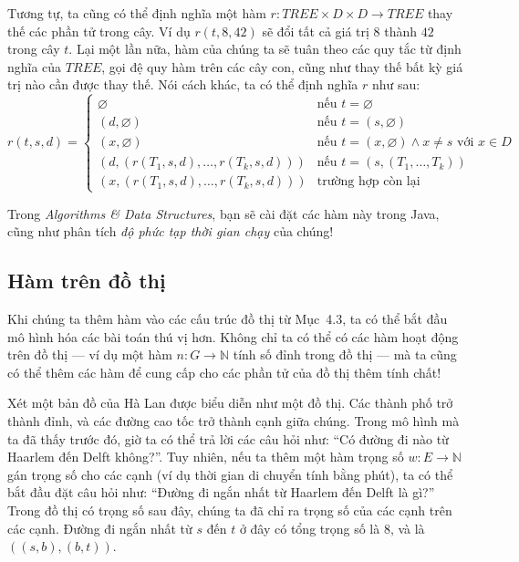 Tương tự, ta cũng có thể định nghĩa một hàm $r\colon \mathit{TREE} \times D \times D \to \mathit{TREE}$ thay thế các phần tử trong cây. Ví dụ $r(t,8,42)$ sẽ đổi tất cả giá trị $8$ thành $42$ trong cây $t$. Lại một lần nữa, hàm của chúng ta sẽ tuân theo các quy tắc từ định nghĩa của $\mathit{TREE}$, gọi đệ quy hàm trên các cây con, cũng như thay thế bất kỳ giá trị nào cần được thay thế. Nói cách khác, ta có thể định nghĩa $r$ như sau:
\[
r(t,s,d) = \begin{cases}
\varnothing & \text{nếu } t = \varnothing \\
(d, \varnothing) & \text{nếu } t = (s, \varnothing) \\
(x, \varnothing) & \text{nếu } t = (x, \varnothing) \wedge x \neq s \text{ với } x \in D \\
(d, (r(T_1,s,d), \ldots, r(T_k,s,d))) & \text{nếu } t = (s, (T_1, \ldots, T_k)) \\
(x, (r(T_1,s,d), \ldots, r(T_k,s,d))) & \text{trường hợp còn lại}
\end{cases}
\]

\begin{infobox}
Trong \emph{Algorithms \& Data Structures}, bạn sẽ cài đặt các hàm này trong Java, cũng như phân tích \emph{độ phức tạp thời gian chạy} của chúng!
\end{infobox}

\subsection{Hàm trên đồ thị}

Khi chúng ta thêm hàm vào các cấu trúc đồ thị từ Mục~4.3, ta có thể bắt đầu mô hình hóa các bài toán thú vị hơn. Không chỉ ta có thể có các hàm hoạt động trên đồ thị --- ví dụ một hàm $n\colon G \to \mathbb{N}$ tính số đỉnh trong đồ thị --- mà ta cũng có thể thêm các hàm để cung cấp cho các phần tử của đồ thị thêm tính chất!

Xét một bản đồ của Hà Lan được biểu diễn như một đồ thị. Các thành phố trở thành đỉnh, và các đường cao tốc trở thành cạnh giữa chúng. Trong mô hình mà ta đã thấy trước đó, giờ ta có thể trả lời các câu hỏi như: ``Có đường đi nào từ Haarlem đến Delft không?''. Tuy nhiên, nếu ta thêm một hàm trọng số $w\colon E \to \mathbb{N}$ gán trọng số cho các cạnh (ví dụ thời gian di chuyển tính bằng phút), ta có thể bắt đầu đặt câu hỏi như: ``Đường đi ngắn nhất từ Haarlem đến Delft là gì?'' Trong đồ thị có trọng số sau đây, chúng ta đã chỉ ra trọng số của các cạnh trên các cạnh. Đường đi ngắn nhất từ $s$ đến $t$ ở đây có tổng trọng số là $8$, và là $((s,b),(b,t))$.

